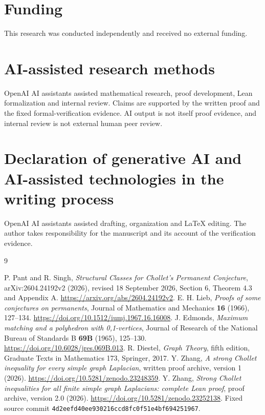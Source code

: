 \documentclass[11pt]{article}
\theoremstyle{remark}\newtheorem{remark}[theorem]{Remark}
\begin{document}
\section*{Funding}
This research was conducted independently and received no external funding.
\section*{AI-assisted research methods}
OpenAI AI assistants assisted mathematical research, proof development,
Lean formalization and internal review. Claims are supported by the
written proof and the fixed formal-verification evidence. AI output is
not itself proof evidence, and internal review is not external human
peer review.
\section*{Declaration of generative AI and AI-assisted technologies
in the writing process}
OpenAI AI assistants assisted drafting, organization and LaTeX editing.
The author takes responsibility for the manuscript and its account of
the verification evidence.

\begin{thebibliography}{9}
\raggedright
{}
P. Pant and R. Singh, \emph{Structural Classes for Chollet's Permanent
Conjecture}, arXiv:2604.24192v2 (2026), revised 18 September 2026,
Section 6, Theorem 4.3 and Appendix A.
\url{https://arxiv.org/abs/2604.24192v2}.
E. H. Lieb, \emph{Proofs of some conjectures on permanents},
Journal of Mathematics and Mechanics \textbf{16} (1966), 127--134.
\url{https://doi.org/10.1512/iumj.1967.16.16008}.
J. Edmonds, \emph{Maximum matching and a polyhedron with 0,1-vertices},
Journal of Research of the National Bureau of Standards B \textbf{69B}
(1965), 125--130. \url{https://doi.org/10.6028/jres.069B.013}.
R. Diestel, \emph{Graph Theory}, fifth edition, Graduate Texts in
Mathematics 173, Springer, 2017.
Y. Zhang, \emph{A strong Chollet inequality for every simple graph
Laplacian}, written proof archive, version 1 (2026).
\url{https://doi.org/10.5281/zenodo.23248359}.
Y. Zhang, \emph{Strong Chollet inequalities for all finite simple graph
Laplacians: complete Lean proof}, proof archive, version 2.0 (2026).
\url{https://doi.org/10.5281/zenodo.23252138}.
Fixed source commit \nolinkurl{4d2eefd40ee930216ccd8fc0f51e4bf694251967}.
\end{thebibliography}
\end{document}
